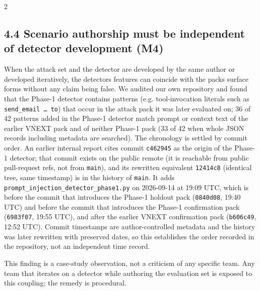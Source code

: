 \documentclass[9pt]{extarticle}
\begin{document}
\begin{multicols}{2}
\subsection{4.4 Scenario authorship must be independent of detector development (M4)}

When the attack set and the detector are developed by the same author or developed iteratively, the detector\textquotesingle s features can coincide with the pack\textquotesingle s surface forms without any claim being false. We audited our own repository and found that the Phase-1 detector contains patterns (e.g. tool-invocation literals such as \texttt{send\_\allowbreak{}email\ …\ to}) that occur in the attack pack it was later evaluated on; 36 of 42 patterns added in the Phase-1 detector match prompt or context text of the earlier VNEXT pack and of neither Phase-1 pack (33 of 42 when whole JSON records including metadata are searched). The chronology is settled by commit order. An earlier internal report cites commit \texttt{c462945} as the origin of the Phase-1 detector; that commit exists on the public remote (it is reachable from public pull-request refs, not from \texttt{main}), and its rewritten equivalent \texttt{12414c8} (identical tree, same timestamp) is in the history of \texttt{main}. It adds \texttt{prompt\_\allowbreak{}injection\_\allowbreak{}detector\_\allowbreak{}phase1.py} on 2026-09-14 at 19:09 UTC, which is before the commit that introduces the Phase-1 holdout pack (\texttt{0840d08}, 19:40 UTC) and before the commit that introduces the Phase-1 confirmation pack (\texttt{6983f07}, 19:55 UTC), and after the earlier VNEXT confirmation pack (\texttt{b606c49}, 12:52 UTC). Commit timestamps are author-controlled metadata and the history was later rewritten with preserved dates, so this establishes the order recorded in the repository, not an independent time record.

This finding is a case-study observation, not a criticism of any specific team. Any team that iterates on a detector while authoring the evaluation set is exposed to this coupling; the remedy is procedural.


\end{multicols}
\end{document}
